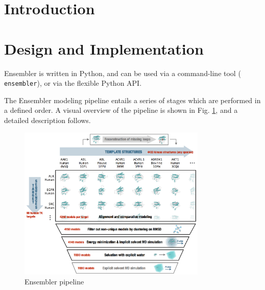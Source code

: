 \documentclass[aps,pre,twocolumn,nofootinbib,superscriptaddress,linenumbers]{revtex4-1}
\begin{document}
\maketitle

\section{Introduction}
\label{section:introduction}

\section{Design and Implementation}


Ensembler is written in Python, and can be used via a command-line tool ({\tt
ensembler}), or via the flexible Python API.


The Ensembler modeling pipeline entails a series of stages which are performed
in a defined order. A visual overview of the pipeline is shown in Fig.
\ref{figpipeline}, and a detailed description follows.

\begin{figure}[h]
  \centering
    \includegraphics[width=0.8\textwidth]{pipeline}
  \caption{Ensembler pipeline}
  \label{figpipeline}
\end{figure}
\end{document}
